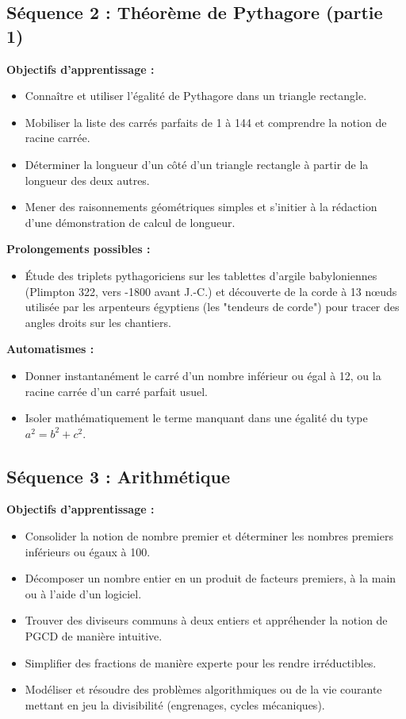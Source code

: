 \documentclass[11pt,a4paper]{article}
\begin{document}
\subsection{Séquence 2 : Théorème de Pythagore (partie 1)}
\textbf{Objectifs d’apprentissage :}
\begin{itemize}
    \item Connaître et utiliser l'égalité de Pythagore dans un triangle rectangle.
    \item Mobiliser la liste des carrés parfaits de 1 à 144 et comprendre la notion de racine carrée.
    \item Déterminer la longueur d'un côté d’un triangle rectangle à partir de la longueur des deux autres.
    \item Mener des raisonnements géométriques simples et s’initier à la rédaction d’une démonstration de calcul de longueur.
\end{itemize}

\textbf{Prolongements possibles :}
\begin{itemize}
    \item Étude des triplets pythagoriciens sur les tablettes d'argile babyloniennes (Plimpton 322, vers -1800 avant J.-C.) et découverte de la corde à 13 nœuds utilisée par les arpenteurs égyptiens (les "tendeurs de corde") pour tracer des angles droits sur les chantiers.
\end{itemize}

\textbf{Automatismes :}
\begin{itemize}
    \item Donner instantanément le carré d’un nombre inférieur ou égal à 12, ou la racine carrée d'un carré parfait usuel.
    \item Isoler mathématiquement le terme manquant dans une égalité du type $a^2 = b^2 + c^2$.
\end{itemize}

\subsection{Séquence 3 : Arithmétique}
\textbf{Objectifs d’apprentissage :}
\begin{itemize}
    \item Consolider la notion de nombre premier et déterminer les nombres premiers inférieurs ou égaux à 100.
    \item Décomposer un nombre entier en un produit de facteurs premiers, à la main ou à l’aide d’un logiciel.
    \item Trouver des diviseurs communs à deux entiers et appréhender la notion de PGCD de manière intuitive.
    \item Simplifier des fractions de manière experte pour les rendre irréductibles.
    \item Modéliser et résoudre des problèmes algorithmiques ou de la vie courante mettant en jeu la divisibilité (engrenages, cycles mécaniques).
\end{itemize}
\end{document}
